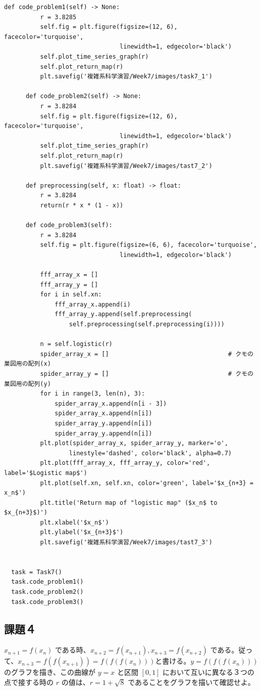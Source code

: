 \begin{lstlisting}[caption=task7.py]
      def code_problem1(self) -> None:
          r = 3.8285
          self.fig = plt.figure(figsize=(12, 6), facecolor='turquoise',
                                linewidth=1, edgecolor='black')
          self.plot_time_series_graph(r)
          self.plot_return_map(r)
          plt.savefig('複雑系科学演習/Week7/images/task7_1')

      def code_problem2(self) -> None:
          r = 3.8284
          self.fig = plt.figure(figsize=(12, 6), facecolor='turquoise',
                                linewidth=1, edgecolor='black')
          self.plot_time_series_graph(r)
          self.plot_return_map(r)
          plt.savefig('複雑系科学演習/Week7/images/tast7_2')

      def preprocessing(self, x: float) -> float:
          r = 3.8284
          return(r * x * (1 - x))

      def code_problem3(self):
          r = 3.8284
          self.fig = plt.figure(figsize=(6, 6), facecolor='turquoise',
                                linewidth=1, edgecolor='black')

          fff_array_x = []
          fff_array_y = []
          for i in self.xn:
              fff_array_x.append(i)
              fff_array_y.append(self.preprocessing(
                  self.preprocessing(self.preprocessing(i))))

          n = self.logistic(r)
          spider_array_x = []                                 # クモの巣図用の配列(x)
          spider_array_y = []                                 # クモの巣図用の配列(y)
          for i in range(3, len(n), 3):
              spider_array_x.append(n[i - 3])
              spider_array_x.append(n[i])
              spider_array_y.append(n[i])
              spider_array_y.append(n[i])
          plt.plot(spider_array_x, spider_array_y, marker='o',
                  linestyle='dashed', color='black', alpha=0.7)
          plt.plot(fff_array_x, fff_array_y, color='red', label='$Logistic map$')
          plt.plot(self.xn, self.xn, color='green', label='$x_{n+3} = x_n$')
          plt.title('Return map of "logistic map" ($x_n$ to $x_{n+3}$)')
          plt.xlabel('$x_n$')
          plt.ylabel('$x_{n+3}$')
          plt.savefig('複雑系科学演習/Week7/images/tast7_3')


  task = Task7()
  task.code_problem1()
  task.code_problem2()
  task.code_problem3()
\end{lstlisting}

\subsection{課題４}
$x_{n+1} = f \left( x_n \right)$ である時、$x_{n+2} = f \left( x_{n+1} \right), x_{n+3} = f \left( x_{n+2} \right)$ である。従って、$x_{n+3} = f \left( f \left( x_{n+1} \right) \right) = f \left( f \left( f \left( x_n \right) \right) \right)$と書ける。$y = f \left( f \left( f \left( x_n \right) \right) \right)$ のグラフを描き、この曲線が $y = x$ と区間 $[0, 1]$ において互いに異なる３つの点で接する時の $r$ の値は、$r = 1 + \sqrt{8}$ であることをグラフを描いて確認せよ。
